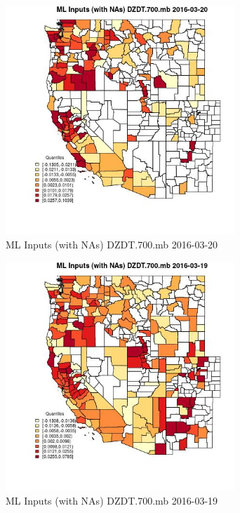 \clearpage 

\begin{figure} 
\centering  
\includegraphics[width=0.77\textwidth]{Code_Outputs/Report_ML_input_PM25_Step4_part_e_de_duplicated_aveswNAs_CountyDZDT700mbMean2016-03-20_2016-03-20.jpg} 
\caption{\label{fig:Report_ML_input_PM25_Step4_part_e_de_duplicated_aveswNAsCountyDZDT700mbMean2016-03-20_2016-03-20}ML Inputs (with NAs) DZDT.700.mb 2016-03-20} 
\end{figure} 
 

\begin{figure} 
\centering  
\includegraphics[width=0.77\textwidth]{Code_Outputs/Report_ML_input_PM25_Step4_part_e_de_duplicated_aveswNAs_CountyDZDT700mbMean2016-03-19_2016-03-19.jpg} 
\caption{\label{fig:Report_ML_input_PM25_Step4_part_e_de_duplicated_aveswNAsCountyDZDT700mbMean2016-03-19_2016-03-19}ML Inputs (with NAs) DZDT.700.mb 2016-03-19} 
\end{figure} 
 


